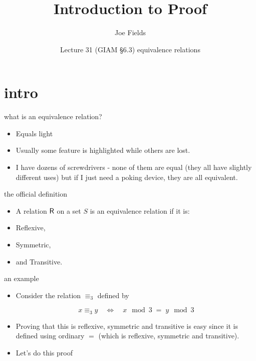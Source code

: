 \documentclass[handout,landscape]{beamer}
\author{Joe Fields}
\title{Introduction to Proof}
\date{Lecture 31 (GIAM \S 6.3) \newline equivalence relations}
\institute[SCSU]{ {\tt fieldsj1@southernct.edu} }
\begin{document}
\begin{frame}[plain]
  \titlepage
\end{frame}

\section{intro}

\begin{frame}{what is an equivalence relation?}
\begin{itemize}
\item Equals light\pause
\item Usually some feature is highlighted while others are lost. \pause
\item I have dozens of screwdrivers - none of them are equal (they all have slightly different uses) but if I just need a poking device, they are all equivalent.  \pause
\end{itemize}
\end{frame}

\begin{frame}{the official definition}
\begin{itemize}
\item A relation $\mbox{\textsf R}$ on a set $S$ is an equivalence relation if it is:\pause
\item Reflexive,\pause
\item Symmetric,\pause
\item and Transitive.
\end{itemize}
\end{frame}

\begin{frame}{an example}
\begin{itemize}
\item Consider the relation $\equiv_3$ defined by

\[ x \equiv_3 y \quad \iff \quad x \mod{3} \; = \; y \mod{3} \] \pause
\item Proving that this is reflexive, symmetric and transitive is easy since it is defined using ordinary $=$ (which is reflexive, symmetric and transitive).  \pause
\item Let's do this proof\textellipsis
\end{itemize}
\end{frame}
\end{document}
